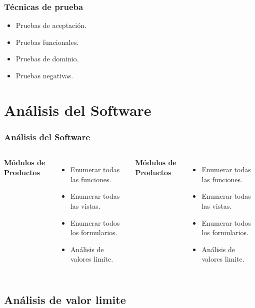 \documentclass{beamer}
\begin{document}
\begin{frame}
\frametitle{Técnicas de prueba}
\begin{itemize}
\item Pruebas de aceptación.
\item Pruebas funcionales.
\item Pruebas de dominio.
\item Pruebas negativas.
\end{itemize}
\end{frame}

\section{Análisis del Software}

\begin{frame}
\frametitle{Análisis del Software}
\begin{columns}
\textbf{Módulos de Productos}
\begin{itemize}
\item Enumerar todas las funciones.
\item Enumerar todas las vistas.
\item Enumerar todos los formularios.
\item Análisis de valores limite.
\end{itemize}
\textbf{Módulos de Productos}
\begin{itemize}
\item Enumerar todas las funciones.
\item Enumerar todas las vistas.
\item Enumerar todos los formularios.
\item Análisis de valores limite.
\end{itemize}
\end{columns}
\end{frame}

\subsection{Análisis de valor limite}
\end{document}
